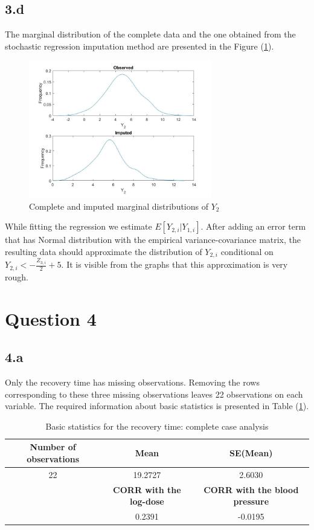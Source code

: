 \documentclass{article}
\begin{document}
\subsection*{3.d}

  
The marginal distribution of the complete data and the one obtained from the stochastic regression imputation method are presented in the Figure  (\ref{Fig_4}).

\begin{figure}[H]
\centering
\caption{Complete and imputed marginal distributions of $Y_{2}$}
\label{Fig_4}
\includegraphics[width=8cm]{q3d.jpg}
\end{figure} 

While fitting the regression we estimate $E\left[Y_{2,i}|Y_{1,i}\right]$. After adding an error term that has Normal distribution with the empirical variance-covariance matrix, the resulting data should approximate the distribution of $Y_{2,i}$ conditional on   $Y_{2,i}<-\frac{Z_{3,i}}{2}+5$. It is visible from the graphs that this approximation is very rough. 

\section*{Question 4}


\subsection*{4.a}

Only the recovery time has missing observations. Removing the rows corresponding to these three missing observations leaves 22 observations on each variable. The required information about basic statistics is presented in Table (\ref{Tab_1}).


\begin{table}[H]
\caption{Basic statistics for the recovery time: complete case analysis}
\label{Tab_1}
\begin{tabular}{|c |c| c|}

\hline
\hline
 \textbf{Number of observations} & \textbf{Mean} &\textbf{SE(Mean)} \\[2ex]
\hline
22 &19.2727 & 2.6030 \\
\hline
 &\textbf{CORR with the log-dose} &\textbf{CORR with the blood pressure} \\[2ex] 
\hline
 &0.2391 &-0.0195 \\
\hline
\hline

\end{tabular}
\end{table}
\end{document}
